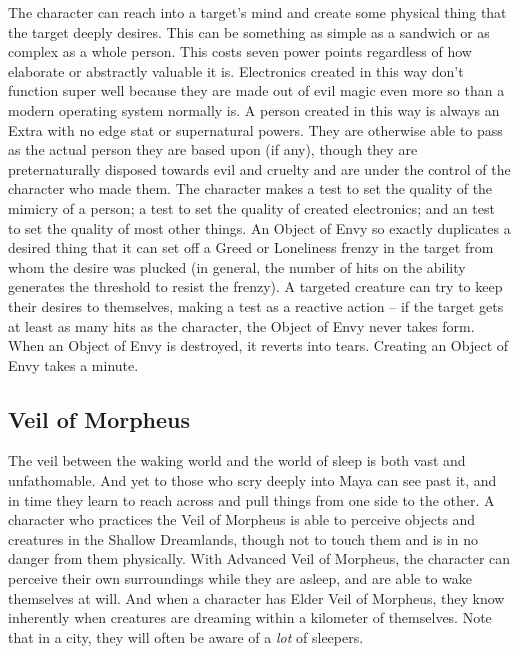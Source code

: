  The character can reach into a target's mind and create some physical thing that the target deeply desires. This can be something as simple as a sandwich or as complex as a whole person. This costs seven power points regardless of how elaborate or abstractly valuable it is. Electronics created in this way don't function super well because they are made out of evil magic even more so than a modern operating system normally is. A person created in this way is always an Extra with no edge stat or supernatural powers. They are otherwise able to pass as the actual person they are based upon (if any), though they are preternaturally disposed towards evil and cruelty and are under the control of the character who made them. The character makes a  test to set the quality of the mimicry of a person; a  test to set the quality of created electronics; and an  test to set the quality of most other things. An Object of Envy so exactly duplicates a desired thing that it can set off a Greed or Loneliness frenzy in the target from whom the desire was plucked (in general, the number of hits on the ability generates the threshold to resist the frenzy). A targeted creature can try to keep their desires to themselves, making a  test as a reactive action -- if the target gets at least as many hits as the character, the Object of Envy never takes form. When an Object of Envy is destroyed, it reverts into tears. Creating an Object of Envy takes a minute.


\subsection{Veil of Morpheus}

The veil between the waking world and the world of sleep is both vast and unfathomable. And yet to those who scry deeply into Maya can see past it, and in time they learn to reach across and pull things from one side to the other. A character who practices the Veil of Morpheus is able to perceive objects and creatures in the Shallow Dreamlands, though not to touch them and is in no danger from them physically. With Advanced Veil of Morpheus, the character can perceive their own surroundings while they are asleep, and are able to wake themselves at will. And when a character has Elder Veil of Morpheus, they know inherently when creatures are dreaming within a kilometer of themselves. Note that in a city, they will often be aware of a \textit{lot} of sleepers.

